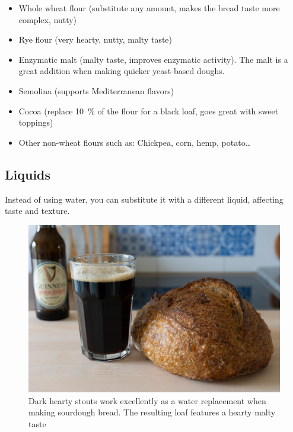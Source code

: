 \begin{itemize}
  \item Whole wheat flour (substitute any amount, makes the bread taste more
      complex, nutty)
  \item Rye flour (very hearty, nutty, malty taste)
  \item Enzymatic malt (malty taste, improves enzymatic activity). The malt is
    a great addition when making quicker yeast-based doughs.
  \item Semolina (supports Mediterranean flavors)
  \item Cocoa (replace \qty{10}{\percent} of the flour for a black loaf, goes
      great with sweet toppings)
  \item Other non-wheat flours such as: Chickpea, corn, hemp, potato\dots{}
\end{itemize}

\subsection{Liquids}

Instead of using water, you can substitute it with a different liquid,
affecting taste and texture.

\begin{figure}[htb!]
  \includegraphics[width=\textwidth]{beer-bread}
  \caption[Stout beer bread]{Dark hearty stouts work excellently as a water replacement
  when making sourdough bread. The resulting loaf features a hearty malty taste}%
\end{figure}

